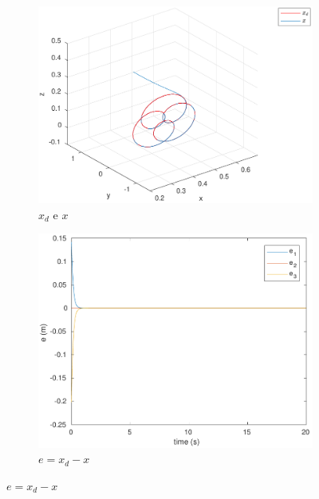 \documentclass[a4paper,11pt]{article}
\theoremstyle{mytheor}
\begin{document}
\begin{figure}[!ht]
\centering
  \begin{minipage}{\linewidth}
  \centering
    \begin{subfigure}[b]{1\textwidth}
    \includegraphics[width=1\textwidth]{figs/ex1_a_1_x.pdf}
    \caption{$x_d$ e $x$}
    \label{fig:ex1_a_1_x}
    \end{subfigure}
  \end{minipage}
  \begin{minipage}{\linewidth}
  \centering
    \begin{subfigure}[b]{0.45\textwidth}
    \includegraphics[width=1\textwidth]{figs/ex1_a_1_e.pdf}
    \caption{$e = x_d - x$}
    \label{fig:ex1_a_1_e}

\end{subfigure}
\end{minipage}
\end{figure}
\end{document}

